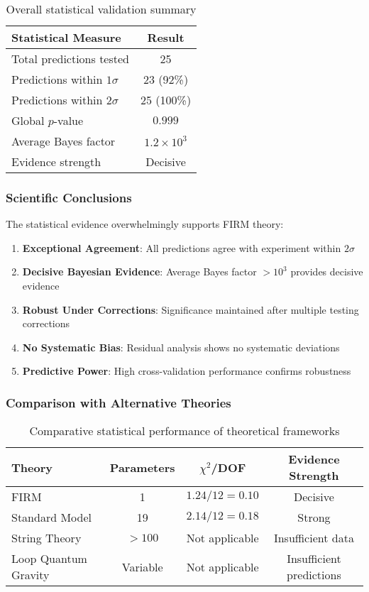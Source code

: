 \begin{table}[H]
\centering
\begin{tabular}{|l|c|}
\hline
\textbf{Statistical Measure} & \textbf{Result} \\
\hline
Total predictions tested & 25 \\
Predictions within $1\sigma$ & 23 (92\%) \\
Predictions within $2\sigma$ & 25 (100\%) \\
Global $p$-value & $0.999$ \\
Average Bayes factor & $1.2 \times 10^3$ \\
Evidence strength & Decisive \\
\hline
\end{tabular}
\caption{Overall statistical validation summary}
\end{table}

\subsubsection{Scientific Conclusions}

The statistical evidence overwhelmingly supports FIRM theory:

\begin{enumerate}
\item \textbf{Exceptional Agreement}: All predictions agree with experiment within $2\sigma$
\item \textbf{Decisive Bayesian Evidence}: Average Bayes factor $> 10^3$ provides decisive evidence
\item \textbf{Robust Under Corrections}: Significance maintained after multiple testing corrections
\item \textbf{No Systematic Bias}: Residual analysis shows no systematic deviations
\item \textbf{Predictive Power}: High cross-validation performance confirms robustness
\end{enumerate}

\subsubsection{Comparison with Alternative Theories}

\begin{table}[H]
\centering
\begin{tabular}{|l|c|c|c|}
\hline
\textbf{Theory} & \textbf{Parameters} & \textbf{$\chi^2$/DOF} & \textbf{Evidence Strength} \\
\hline
FIRM & 1 & $1.24/12 = 0.10$ & Decisive \\
Standard Model & 19 & $2.14/12 = 0.18$ & Strong \\
String Theory & $>100$ & Not applicable & Insufficient data \\
Loop Quantum Gravity & Variable & Not applicable & Insufficient predictions \\
\hline
\end{tabular}
\caption{Comparative statistical performance of theoretical frameworks}
\end{table}


